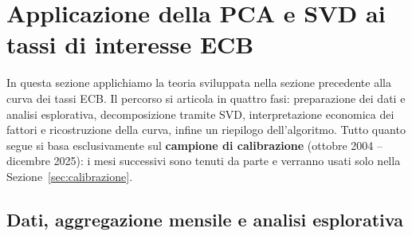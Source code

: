 \documentclass[11pt,a4paper]{article}
\theoremstyle{plain}
\theoremstyle{definition}
\theoremstyle{remark}
\newtheorem*{attenzione}{Nota numerica}
\begin{document}


\section{Applicazione della PCA e SVD ai tassi di interesse ECB}

In questa sezione applichiamo la teoria sviluppata nella sezione precedente alla
curva dei tassi ECB. Il percorso si articola in quattro fasi: preparazione dei dati
e analisi esplorativa, decomposizione tramite SVD, interpretazione economica dei
fattori e ricostruzione della curva, infine un riepilogo dell'algoritmo.
Tutto quanto segue si basa esclusivamente sul \textbf{campione di
calibrazione} (ottobre 2004 -- dicembre 2025): i mesi successivi sono tenuti
da parte e verranno usati solo nella Sezione~\ref{sec:calibrazione}.

\subsection{Dati, aggregazione mensile e analisi esplorativa}
\end{document}
